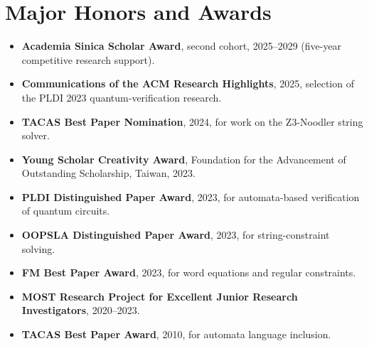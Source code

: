 \documentclass[11pt,a4paper]{article}
\begin{document}
\section{Major Honors and Awards}
\begin{itemize}
\item \textbf{Academia Sinica Scholar Award}, second cohort, 2025--2029 (five-year competitive research support).
\item \textbf{Communications of the ACM Research Highlights}, 2025, selection of the PLDI 2023 quantum-verification research.
\item \textbf{TACAS Best Paper Nomination}, 2024, for work on the Z3-Noodler string solver.
\item \textbf{Young Scholar Creativity Award}, Foundation for the Advancement of Outstanding Scholarship, Taiwan, 2023.
\item \textbf{PLDI Distinguished Paper Award}, 2023, for automata-based verification of quantum circuits.
\item \textbf{OOPSLA Distinguished Paper Award}, 2023, for string-constraint solving.
\item \textbf{FM Best Paper Award}, 2023, for word equations and regular constraints.
\item \textbf{MOST Research Project for Excellent Junior Research Investigators}, 2020--2023.
\item \textbf{TACAS Best Paper Award}, 2010, for automata language inclusion.
\end{itemize}
\end{document}
